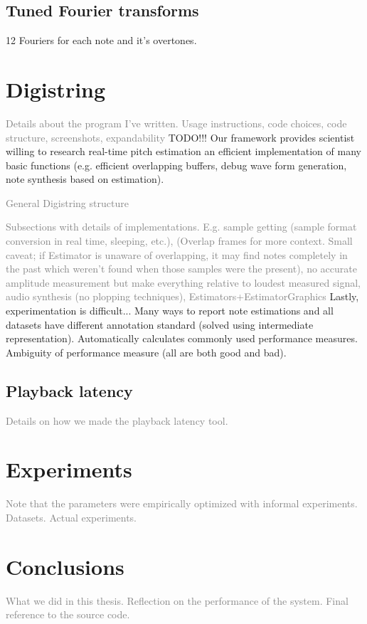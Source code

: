 \documentclass[10pt,twocolumn]{article}
\begin{document}
\subsection{Tuned Fourier transforms}
12 Fouriers for each note and it's overtones.


\section{Digistring}
\textcolor{gray}{Details about the program I've written. Usage instructions, code choices, code structure, screenshots, expandability}
TODO!!! Our framework provides scientist willing to research real-time pitch estimation an efficient implementation of many basic functions (e.g. efficient overlapping buffers, debug wave form generation, note synthesis based on estimation).

\textcolor{gray}{General Digistring structure}

\textcolor{gray}{Subsections with details of implementations. E.g. sample getting (sample format conversion in real time, sleeping, etc.), (Overlap frames for more context. Small caveat; if Estimator is unaware of overlapping, it may find notes completely in the past which weren't found when those samples were the present), no accurate amplitude measurement but make everything relative to loudest measured signal, audio synthesis (no plopping techniques), Estimators+EstimatorGraphics}
Lastly, experimentation is difficult... Many ways to report note estimations and all datasets have different annotation standard (solved using intermediate representation). Automatically calculates commonly used performance measures. Ambiguity of performance measure (all are both good and bad).

\subsection{Playback latency}  \label{sub:playback_latency}
\textcolor{gray}{Details on how we made the playback latency tool.}


\section{Experiments}  \label{sec:exp}
\textcolor{gray}{Note that the parameters were empirically optimized with informal experiments. Datasets. Actual experiments.}


\section{Conclusions}
\textcolor{gray}{What we did in this thesis. Reflection on the performance of the system. Final reference to the source code.}
\end{document}
